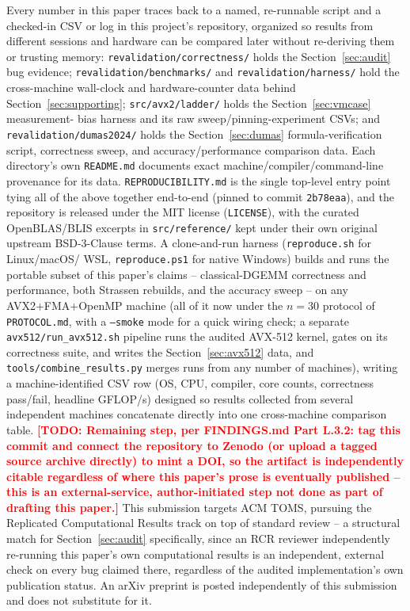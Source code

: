 \documentclass[acmsmall]{acmart}
\newcommand{\todo}[1]{\textcolor{red}{\textbf{[TODO: #1]}}}
\begin{document}
Every number in this paper traces back to a named, re-runnable script
and a checked-in CSV or log in this project's repository, organized so
results from different sessions and hardware can be compared later
without re-deriving them or trusting memory: \texttt{revalidation/correctness/}
holds the Section~\ref{sec:audit} bug evidence; \texttt{revalidation/benchmarks/}
and \texttt{revalidation/harness/} hold the cross-machine wall-clock and
hardware-counter data behind Section~\ref{sec:supporting};
\texttt{src/avx2/ladder/} holds the Section~\ref{sec:vmcase} measurement-
bias harness and its raw sweep/pinning-experiment CSVs; and
\texttt{revalidation/dumas2024/} holds the Section~\ref{sec:dumas}
formula-verification script, correctness sweep, and accuracy/performance
comparison data. Each directory's own \texttt{README.md} documents
exact machine/compiler/command-line provenance for its data.
\texttt{REPRODUCIBILITY.md} is the single top-level entry point tying
all of the above together end-to-end (pinned to commit
\texttt{2b78eaa}), and the repository is released under the MIT
license (\texttt{LICENSE}), with the curated OpenBLAS/BLIS excerpts in
\texttt{src/reference/} kept under their own original upstream BSD-3-Clause
terms. A clone-and-run harness (\texttt{reproduce.sh} for Linux/macOS/
WSL, \texttt{reproduce.ps1} for native Windows) builds and runs the
portable subset of this paper's claims -- classical-DGEMM correctness
and performance, both Strassen rebuilds, and the accuracy sweep -- on
any AVX2+FMA+OpenMP machine (all of it now under the $n{=}30$
protocol of \texttt{PROTOCOL.md}, with a \texttt{--smoke} mode for a
quick wiring check; a separate \texttt{avx512/run\_avx512.sh} pipeline
runs the audited AVX-512 kernel, gates on its correctness suite, and
writes the Section~\ref{sec:avx512} data, and \texttt{tools/combine\_results.py}
merges runs from any number of machines), writing a
machine-identified CSV row (OS, CPU, compiler, core counts,
correctness pass/fail, headline GFLOP/s) designed so results collected
from several independent machines concatenate directly into one
cross-machine comparison table. \todo{Remaining step, per FINDINGS.md Part L.3.2: tag this
commit and connect the repository to Zenodo (or upload a tagged source
archive directly) to mint a DOI, so the artifact is independently
citable regardless of where this paper's prose is eventually
published -- this is an external-service, author-initiated step not
done as part of drafting this paper.} This submission targets ACM
TOMS, pursuing the Replicated Computational Results track on top of
standard review -- a structural match for Section~\ref{sec:audit}
specifically, since an RCR reviewer independently re-running this
paper's own computational results is an independent, external check
on every bug claimed there, regardless of the audited implementation's
own publication status. An arXiv preprint is posted independently of
this submission and does not substitute for it.
\end{document}
